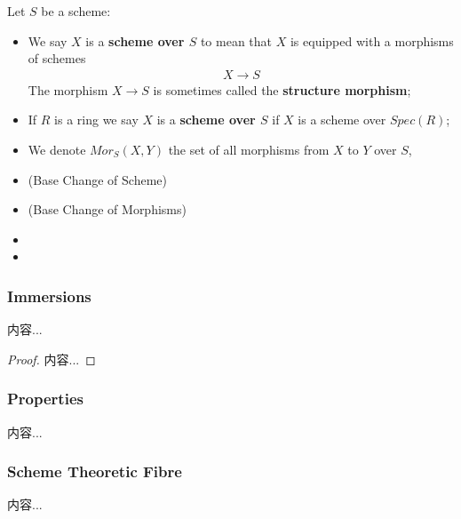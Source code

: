 \documentclass[Total.tex]{subfiles}
\begin{document}
				\begin{Def}
					Let $S$ be a scheme:
					\begin{itemize}
						\item We say $X$ is a \textbf{scheme over $S$} to mean that $X$ is equipped with a morphisms of schemes 
						\begin{gather*}
							X\rightarrow S
						\end{gather*}
						The morphism $X\rightarrow S$ is sometimes called the \textbf{structure morphism};
						\item If $R$ is a ring we say $X$ is a \textbf{scheme over $S$} if $X$ is a scheme over $Spec(R)$;
						\item We denote $Mor_S(X,Y)$ the set of all morphisms from $X$ to $Y$ over $S$,
						\begin{center}
						\end{center}
						\item (Base Change of Scheme)
						\item (Base Change of Morphisms)
						\item 
						\item 
					\end{itemize}
				\end{Def}
				\subsubsection{Immersions}
				\begin{lemma}
					内容...
				\end{lemma}
				
				\begin{proof}
					内容...
				\end{proof}
				\subsubsection{Properties}
				\begin{Def}
					内容...
				\end{Def}
				\subsubsection{Scheme Theoretic Fibre}
				\begin{Def}
					内容...
				\end{Def}
				
\end{document}
